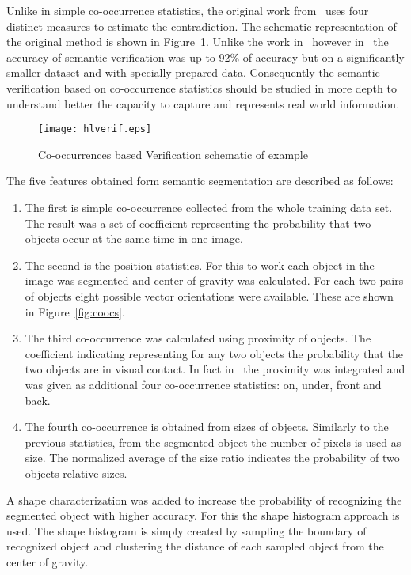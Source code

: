 \documentclass[conference]{IEEEtran}
\begin{document}
Unlike in simple co-occurrence statistics, the original work from~\cite{lukac:15}  uses four distinct measures to estimate the contradiction. The schematic representation of the original method is shown in Figure~\ref{fig:fbv}. Unlike the work in~\cite{lukac:16} however in~\cite{lukac:15}  the accuracy of semantic verification was up to 92\% of accuracy but on a significantly smaller dataset and with specially prepared data. Consequently the semantic verification based on co-occurrence statistics should be studied in more depth to understand better the capacity to capture and represents real world information.

\begin{figure}[bht]
\centering
	\texttt{[image: hlverif.eps]}
	\caption{\label{fig:fbv}Co-occurrences based Verification schematic of example}
\end{figure}
The five features obtained form semantic segmentation are described as follows:
\begin{enumerate}
	\item The first is simple co-occurrence collected from the whole training data set. The result was a set of coefficient representing the probability that two objects occur at the same time in one image. 
	\item The second is the position statistics. For this to work each object in the image was segmented and center of gravity was calculated. For each two pairs of objects eight possible vector orientations were available. These are shown in Figure~\ref{fig:coocs}.
	\item The third co-occurrence was calculated using proximity of objects. The coefficient indicating representing for any two objects the probability that the two objects are in visual contact. In fact in~\cite{lukac:16} the proximity was integrated and was given as additional four co-occurrence statistics: on, under, front and back.
	\item The fourth co-occurrence is obtained from sizes of objects. Similarly to the previous statistics, from the segmented object the number of pixels is used as size. The normalized average of the size ratio indicates the probability of two objects relative sizes. 
\end{enumerate}
A shape characterization was added to increase the probability of recognizing the segmented object with higher accuracy. For this the shape histogram approach is used. The shape histogram is simply created by sampling the boundary of recognized object and clustering the distance of each sampled object from the center of gravity. 
\end{document}
